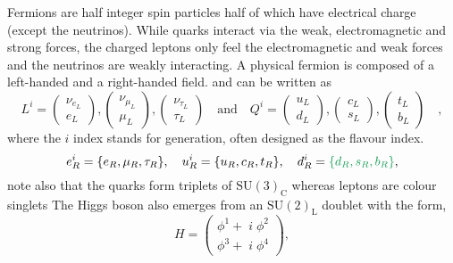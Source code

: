 Fermions are half integer spin particles\Joaoadd{,} half of which have electrical charge (except the neutrinos).  While quarks interact via the weak, electromagnetic and strong forces, the charged leptons only feel the electromagnetic and weak forces and the neutrinos are weakly interacting.  
%
A physical fermion is composed of a left-handed and a right-handed field.  and can be written as
%
\begin{equation}\label{eq:Left_boys}
L^i= \begin{pmatrix}
\nu_{e_L} \\ e_L 
\end{pmatrix},
\begin{pmatrix}
\nu_{\mu_L} \\ \mu_L 
\end{pmatrix},
\begin{pmatrix}
\nu_{\tau_L} \\ \tau_L 
\end{pmatrix} 
\quad 
\text{and} \quad Q^i= \begin{pmatrix}
u_{L} \\
d_L 
\end{pmatrix},\begin{pmatrix}
c_{L} \\
s_L 
\end{pmatrix}
,\begin{pmatrix}
t_{L} \\
b_L 
\end{pmatrix} \quad ,
\end{equation}
where the $i$ index stands for generation, often designed as the flavour index. 
%
 \begin{equation}\label{eq:Right_boys}
e^i_R=\{e_R,\mu_R,\tau_R\}, \quad  u^i_R=\{u_R,c_R,t_R\}, \quad d^i_R=\Joaoadd{\{d_{R},s_{R},b_{R}\}}, 
\end{equation}
%
note also that the quarks form triplets of $\mathrm{SU(3)_C}$ whereas leptons are colour singlets  The Higgs boson also emerges from an $\mathrm{SU(2)_L}$ doublet with the form,
%
\begin{equation}\label{eq:Higgs_doublet}
H=\begin{pmatrix}
\phi^1 + \; i \; \phi^2 \\
\phi^3 + \; i \; \phi^4  
\end{pmatrix}, 
\end{equation}

